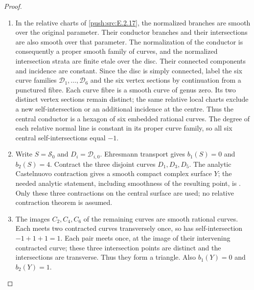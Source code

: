 \begin{proof}

\begin{enumerate}[label={$\langle1\rangle$\arabic*.},leftmargin=*]
\item In the relative charts of \ref{push:src:E.2.17}, the normalized
branches are smooth over the original parameter.
Their conductor branches and their intersections
are also smooth over that parameter.  The
normalization of the conductor is consequently
a proper smooth family of curves, and the
normalized intersection strata are finite
etale over the disc.  Their connected components
and incidence are constant.  Since the disc
is simply connected, label the six curve
families $\mathcal D_1,\ldots,\mathcal D_6$
and the six vertex sections by continuation
from a punctured fibre.  Each curve fibre
is a smooth curve of genus zero.  Its two
distinct vertex sections remain distinct;
the same relative local charts exclude a
new self-intersection or an additional
incidence at the centre.  Thus the central
conductor is a hexagon of six embedded
rational curves.  The degree of each
relative normal line is constant in its
proper curve family, so all six central
self-intersections equal $-1$.

\item Write $S=\mathcal S_0$ and $D_i=\mathcal D_{i,0}$.
Ehresmann transport gives $b_1(S)=0$ and
$b_2(S)=4$.  Contract the three disjoint
curves $D_1,D_3,D_5$.  The analytic
Castelnuovo contraction gives a smooth
compact complex surface $Y$; the needed
analytic statement, including smoothness
of the resulting point, is
\citet[\S4, no.~8(a), pp.~364--365]{Grauert1962E}.
Only these three contractions on the
central surface are used; no relative
contraction theorem is assumed.

\item The images $C_2,C_4,C_6$ of the remaining
curves are smooth rational curves.  Each
meets two contracted curves transversely
once, so has self-intersection
$-1+1+1=1$.  Each pair meets once, at
the image of their intervening contracted
curve; these three intersection points
are distinct and the intersections are
transverse.  Thus they form a triangle.
Also $b_1(Y)=0$ and $b_2(Y)=1$.


\end{enumerate}
\end{proof}
